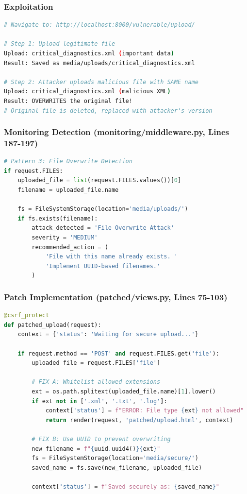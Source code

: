 \documentclass[12pt,a4paper]{article}
\begin{document}
\subsubsection{Exploitation}

\begin{lstlisting}[language=bash]
# Navigate to: http://localhost:8000/vulnerable/upload/

# Step 1: Upload legitimate file
Upload: critical_diagnostics.xml (important data)
Result: Saved as media/uploads/critical_diagnostics.xml

# Step 2: Attacker uploads malicious file with SAME name
Upload: critical_diagnostics.xml (malicious XML)
Result: OVERWRITES the original file!
# Original file is deleted, replaced with attacker's version
\end{lstlisting}

\subsubsection{Monitoring Detection (monitoring/middleware.py, Lines 187-197)}

\begin{lstlisting}[language=Python]
# Pattern 3: File Overwrite Detection
if request.FILES:
    uploaded_file = list(request.FILES.values())[0]
    filename = uploaded_file.name
    
    fs = FileSystemStorage(location='media/uploads/')
    if fs.exists(filename):
        attack_detected = 'File Overwrite Attack'
        severity = 'MEDIUM'
        recommended_action = (
            'File with this name already exists. '
            'Implement UUID-based filenames.'
        )
\end{lstlisting}

\subsubsection{Patch Implementation (patched/views.py, Lines 75-103)}

\begin{lstlisting}[language=Python]
@csrf_protect
def patched_upload(request):
    context = {'status': 'Waiting for secure upload...'}
    
    if request.method == 'POST' and request.FILES.get('file'):
        uploaded_file = request.FILES['file']
        
        # FIX A: Whitelist allowed extensions
        ext = os.path.splitext(uploaded_file.name)[1].lower()
        if ext not in ['.xml', '.txt', '.log']:
            context['status'] = f"ERROR: File type {ext} not allowed"
            return render(request, 'patched/upload.html', context)

        # FIX B: Use UUID to prevent overwriting
        new_filename = f"{uuid.uuid4()}{ext}"
        fs = FileSystemStorage(location='media/secure/')
        saved_name = fs.save(new_filename, uploaded_file)
        
        context['status'] = f"Saved securely as: {saved_name}"
\end{lstlisting}
\end{document}
